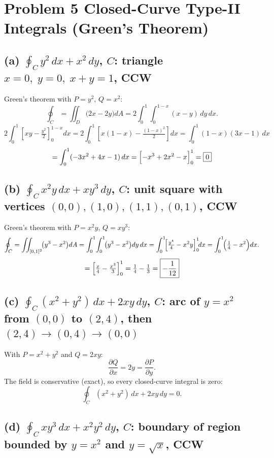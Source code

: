 \documentclass[12pt]{article}
\begin{document}
\section*{Problem 5 \quad Closed-Curve Type-II Integrals (Green's Theorem)}

\subsection*{(a) $\displaystyle\oint_C y^2\,dx+x^2\,dy$,\quad
  $C$: triangle $x=0,\;y=0,\;x+y=1$, CCW}

Green's theorem with $P=y^2$, $Q=x^2$:
\[
  \oint_C=\iint_D\!\bigl(2x-2y\bigr)dA
         =2\int_0^1\int_0^{1-x}(x-y)\,dy\,dx.
\]
\[
  2\int_0^1\!\left[xy-\tfrac{y^2}{2}\right]_0^{1-x}\!dx
  =2\int_0^1\!\left[x(1-x)-\tfrac{(1-x)^2}{2}\right]dx
  =\int_0^1(1-x)(3x-1)\,dx
\]
\[
  =\int_0^1(-3x^2+4x-1)\,dx=\Bigl[-x^3+2x^2-x\Bigr]_0^1=\boxed{0}
\]

\subsection*{(b) $\displaystyle\oint_C x^2y\,dx+xy^3\,dy$,\quad
  $C$: unit square with vertices $(0,0),(1,0),(1,1),(0,1)$, CCW}

Green's theorem with $P=x^2y$, $Q=xy^3$:
\[
  \oint_C=\iint_{[0,1]^2}\!\bigl(y^3-x^2\bigr)dA
  =\int_0^1\!\int_0^1\!\bigl(y^3-x^2\bigr)dy\,dx
  =\int_0^1\!\Bigl[\tfrac{y^4}{4}-x^2y\Bigr]_0^1\!dx
  =\int_0^1\!\Bigl(\tfrac{1}{4}-x^2\Bigr)dx.
\]
\[
  =\Bigl[\tfrac{x}{4}-\tfrac{x^3}{3}\Bigr]_0^1=\tfrac{1}{4}-\tfrac{1}{3}=\boxed{-\dfrac{1}{12}}
\]

\subsection*{(c) $\displaystyle\oint_C(x^2+y^2)\,dx+2xy\,dy$,\quad
  $C$: arc of $y=x^2$ from $(0,0)$ to $(2,4)$, then $(2,4)\to(0,4)\to(0,0)$}

With $P=x^2+y^2$ and $Q=2xy$:
\[
  \frac{\partial Q}{\partial x}=2y=\frac{\partial P}{\partial y}.
\]
The field is conservative (exact), so every closed-curve integral is zero:
\[
  \oint_C(x^2+y^2)\,dx+2xy\,dy=\boxed{0}.
\]

\subsection*{(d) $\displaystyle\oint_C xy^3\,dx+x^2y^2\,dy$,\quad
  $C$: boundary of region bounded by $y=x^2$ and $y=\sqrt{x}$, CCW}
\end{document}
